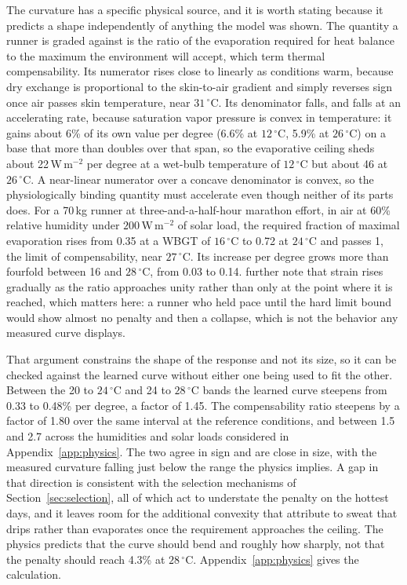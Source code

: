 \documentclass[11pt]{article}
\renewcommand{\_}{\textunderscore\allowbreak}
\begin{document}
The curvature has a specific physical source, and it is worth stating because it predicts a shape independently of anything the model was shown. The quantity a runner is graded against is the ratio of the evaporation required for heat balance to the maximum the environment will accept, which \citet{taylor2006} term thermal compensability. Its numerator rises close to linearly as conditions warm, because dry exchange is proportional to the skin-to-air gradient and simply reverses sign once air passes skin temperature, near $31\,^{\circ}$C. Its denominator falls, and falls at an accelerating rate, because saturation vapor pressure is convex in temperature: it gains about 6\% of its own value per degree (6.6\% at $12\,^{\circ}$C, 5.9\% at $26\,^{\circ}$C) on a base that more than doubles over that span, so the evaporative ceiling sheds about 22\,W\,m$^{-2}$ per degree at a wet-bulb temperature of $12\,^{\circ}$C but about 46 at $26\,^{\circ}$C. A near-linear numerator over a concave denominator is convex, so the physiologically binding quantity must accelerate even though neither of its parts does. For a 70\,kg runner at three-and-a-half-hour marathon effort, in air at 60\% relative humidity under $200\,\mathrm{W\,m^{-2}}$ of solar load, the required fraction of maximal evaporation rises from 0.35 at a WBGT of $16\,^{\circ}$C to 0.72 at $24\,^{\circ}$C and passes 1, the limit of compensability, near $27\,^{\circ}$C. Its increase per degree grows more than fourfold between 16 and $28\,^{\circ}$C, from 0.03 to 0.14. \citet{taylor2006} further note that strain rises gradually as the ratio approaches unity rather than only at the point where it is reached, which matters here: a runner who held pace until the hard limit bound would show almost no penalty and then a collapse, which is not the behavior any measured curve displays.

That argument constrains the shape of the response and not its size, so it can be checked against the learned curve without either one being used to fit the other. Between the 20 to $24\,^{\circ}$C and 24 to $28\,^{\circ}$C bands the learned curve steepens from 0.33 to 0.48\% per degree, a factor of 1.45. The compensability ratio steepens by a factor of 1.80 over the same interval at the reference conditions, and between 1.5 and 2.7 across the humidities and solar loads considered in Appendix~\ref{app:physics}. The two agree in sign and are close in size, with the measured curvature falling just below the range the physics implies. A gap in that direction is consistent with the selection mechanisms of Section~\ref{sec:selection}, all of which act to understate the penalty on the hottest days, and it leaves room for the additional convexity that \citet{taylor2006} attribute to sweat that drips rather than evaporates once the requirement approaches the ceiling. The physics predicts that the curve should bend and roughly how sharply, not that the penalty should reach 4.3\% at $28\,^{\circ}$C. Appendix~\ref{app:physics} gives the calculation.
\end{document}
